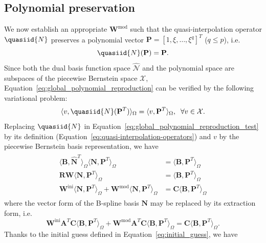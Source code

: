 \subsection{Polynomial preservation}
We now establish an appropriate $\mathbf{W}^\text{mod}$ such that the quasi-interpolation operator $\quasiid{N}$ preserves a polynomial vector $\mathbf{P}=\left[{1, \xi,\dots,\xi^q}\right]^T$ ($q\leq{}p$), i.e.
\begin{equation}
	\quasiid{N}(\mathbf{P})=\mathbf{P}.\label{eq:global_polynomial_reproduction}
\end{equation}
Since both the dual basis function space $\hat{\mathcal{N}}$ and the polynomial space are subspaces of the piecewise Bernstein space $\mathcal{X}$, Equation~\eqref{eq:global_polynomial_reproduction} can be verified by the following variational problem:
\begin{equation}
	\langle v,\quasiid{N}(\mathbf{P}^T)\rangle_\Omega=\langle v,\mathbf{P}^T\rangle_\Omega,\;\; \forall v\in \mathcal{X}.\label{eq:global_polynomial_reproduction_test}
\end{equation}
Replacing $\quasiid{N}$ in Equation~\eqref{eq:global_polynomial_reproduction_test} by its definition (Equation~\eqref{eq:quasi-interpolation-operators}) and $v$ by the piecewise Bernstein basis representation, we have
\begin{align}
	\begin{split}
		\langle\mathbf{B},\hat{\mathbf{N}}^T\rangle_\Omega\langle\mathbf{N},\mathbf{P}^T\rangle_\Omega&=\langle\mathbf{B},\mathbf{P}^T\rangle_\Omega\\
		\mathbf{R}\mathbf{W}\langle\mathbf{N},\mathbf{P}^T\rangle_\Omega&=\langle\mathbf{B},\mathbf{P}^T\rangle_\Omega\\
		\mathbf{W}^\text{ini}\langle\mathbf{N},\mathbf{P}^T\rangle_\Omega+\mathbf{W}^\text{mod}\langle\mathbf{N},\mathbf{P}^T\rangle_\Omega&=\mathbf{C}\langle\mathbf{B},\mathbf{P}^T\rangle_\Omega
	\end{split}
\end{align}
where the vector form of the B-spline basis $\mathbf{N}$ may be replaced by its \Bezier extraction form, i.e.
\begin{equation}
	\mathbf{W}^\text{ini}\mathbf{A}^T\mathbf{C}\langle\mathbf{B},\mathbf{P}^T\rangle_\Omega+\mathbf{W}^\text{mod}\mathbf{A}^T\mathbf{C}\langle\mathbf{B},\mathbf{P}^T\rangle_\Omega=\mathbf{C}\langle\mathbf{B},\mathbf{P}^T\rangle_\Omega.\label{eq:splited_global_polynomial_reproduction_test}
\end{equation}
Thanks to the initial guess defined in Equation~\eqref{eq:initial_guess}, we have
